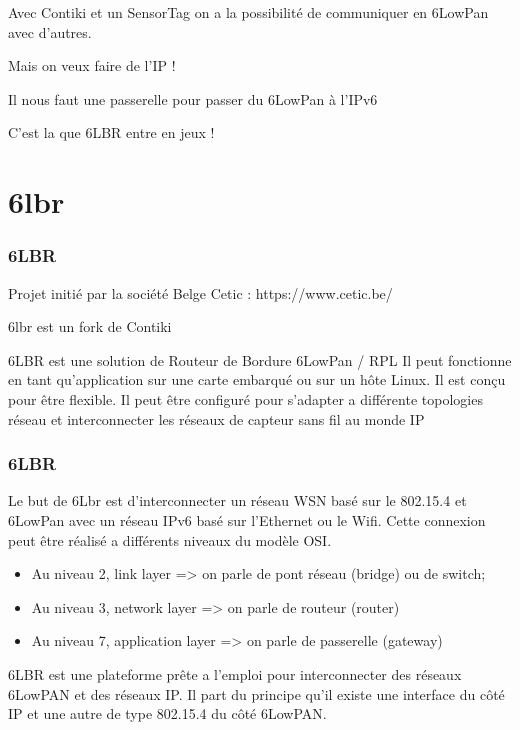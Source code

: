 \documentclass{smilebeamer}
\begin{document}
\begin{frame}

Avec Contiki et un SensorTag on a la possibilité de communiquer en 6LowPan avec d'autres.

Mais on veux faire de l'IP !

Il nous faut une passerelle pour passer du 6LowPan à l'IPv6

C'est la que 6LBR entre en jeux !

\end{frame}

\section{6lbr}

\begin{frame}
\frametitle{6LBR}
Projet initié par la société Belge Cetic :  https://www.cetic.be/

6lbr est un fork de Contiki

6LBR est une solution de Routeur de Bordure 6LowPan / RPL
Il peut fonctionne en tant qu'application sur une carte embarqué ou sur un hôte Linux.
Il est conçu pour être flexible.
Il peut être configuré pour s'adapter a différente topologies réseau et interconnecter les réseaux de capteur sans fil au monde IP
\end{frame}

\begin{frame}
\frametitle{6LBR}

Le but de 6Lbr est d'interconnecter un réseau WSN basé sur le 802.15.4 et 6LowPan avec un réseau IPv6 basé sur l'Ethernet ou le Wifi.
\newline
Cette connexion peut être réalisé a différents niveaux du modèle OSI.
\begin{itemize}

\item Au niveau 2, link layer            => on parle de pont réseau (bridge) ou de switch;
\item Au niveau 3, network layer     => on parle de routeur (router)
\item Au niveau 7, application layer => on parle de passerelle (gateway)
\end{itemize}

6LBR est une plateforme prête a l'emploi pour interconnecter des réseaux 6LowPAN et des réseaux IP. Il part du principe qu'il existe une interface du côté IP et une autre de type 802.15.4 du côté 6LowPAN.
\end{frame}
\end{document}

